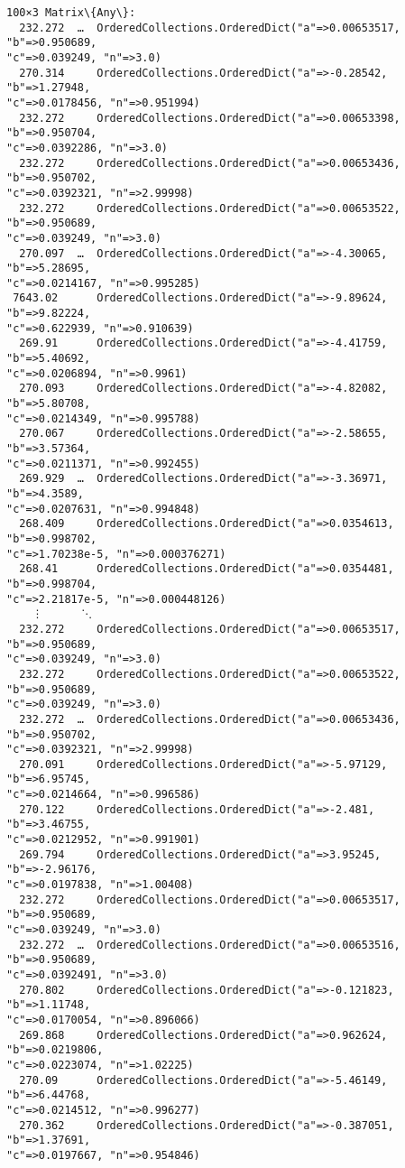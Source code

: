 \documentclass[11pt]{article}
\makeatletter
\newcommand{\boxspacing}{\kern\kvtcb@left@rule\kern\kvtcb@boxsep}
\newcommand{\prompt}[4]{
        {\ttfamily\llap{{\color{#2}[#3]:\hspace{3pt}#4}}\vspace{-\baselineskip}}
    }
\makeatother
\begin{document}
            \begin{tcolorbox}[breakable, size=fbox, boxrule=.5pt, pad at break*=1mm, opacityfill=0]
\prompt{Out}{outcolor}{17}{\boxspacing}
\begin{Verbatim}[commandchars=\\\{\}]
100×3 Matrix\{Any\}:
  232.272  …  OrderedCollections.OrderedDict("a"=>0.00653517, "b"=>0.950689,
"c"=>0.039249, "n"=>3.0)
  270.314     OrderedCollections.OrderedDict("a"=>-0.28542, "b"=>1.27948,
"c"=>0.0178456, "n"=>0.951994)
  232.272     OrderedCollections.OrderedDict("a"=>0.00653398, "b"=>0.950704,
"c"=>0.0392286, "n"=>3.0)
  232.272     OrderedCollections.OrderedDict("a"=>0.00653436, "b"=>0.950702,
"c"=>0.0392321, "n"=>2.99998)
  232.272     OrderedCollections.OrderedDict("a"=>0.00653522, "b"=>0.950689,
"c"=>0.039249, "n"=>3.0)
  270.097  …  OrderedCollections.OrderedDict("a"=>-4.30065, "b"=>5.28695,
"c"=>0.0214167, "n"=>0.995285)
 7643.02      OrderedCollections.OrderedDict("a"=>-9.89624, "b"=>9.82224,
"c"=>0.622939, "n"=>0.910639)
  269.91      OrderedCollections.OrderedDict("a"=>-4.41759, "b"=>5.40692,
"c"=>0.0206894, "n"=>0.9961)
  270.093     OrderedCollections.OrderedDict("a"=>-4.82082, "b"=>5.80708,
"c"=>0.0214349, "n"=>0.995788)
  270.067     OrderedCollections.OrderedDict("a"=>-2.58655, "b"=>3.57364,
"c"=>0.0211371, "n"=>0.992455)
  269.929  …  OrderedCollections.OrderedDict("a"=>-3.36971, "b"=>4.3589,
"c"=>0.0207631, "n"=>0.994848)
  268.409     OrderedCollections.OrderedDict("a"=>0.0354613, "b"=>0.998702,
"c"=>1.70238e-5, "n"=>0.000376271)
  268.41      OrderedCollections.OrderedDict("a"=>0.0354481, "b"=>0.998704,
"c"=>2.21817e-5, "n"=>0.000448126)
    ⋮      ⋱
  232.272     OrderedCollections.OrderedDict("a"=>0.00653517, "b"=>0.950689,
"c"=>0.039249, "n"=>3.0)
  232.272     OrderedCollections.OrderedDict("a"=>0.00653522, "b"=>0.950689,
"c"=>0.039249, "n"=>3.0)
  232.272  …  OrderedCollections.OrderedDict("a"=>0.00653436, "b"=>0.950702,
"c"=>0.0392321, "n"=>2.99998)
  270.091     OrderedCollections.OrderedDict("a"=>-5.97129, "b"=>6.95745,
"c"=>0.0214664, "n"=>0.996586)
  270.122     OrderedCollections.OrderedDict("a"=>-2.481, "b"=>3.46755,
"c"=>0.0212952, "n"=>0.991901)
  269.794     OrderedCollections.OrderedDict("a"=>3.95245, "b"=>-2.96176,
"c"=>0.0197838, "n"=>1.00408)
  232.272     OrderedCollections.OrderedDict("a"=>0.00653517, "b"=>0.950689,
"c"=>0.039249, "n"=>3.0)
  232.272  …  OrderedCollections.OrderedDict("a"=>0.00653516, "b"=>0.950689,
"c"=>0.0392491, "n"=>3.0)
  270.802     OrderedCollections.OrderedDict("a"=>-0.121823, "b"=>1.11748,
"c"=>0.0170054, "n"=>0.896066)
  269.868     OrderedCollections.OrderedDict("a"=>0.962624, "b"=>0.0219806,
"c"=>0.0223074, "n"=>1.02225)
  270.09      OrderedCollections.OrderedDict("a"=>-5.46149, "b"=>6.44768,
"c"=>0.0214512, "n"=>0.996277)
  270.362     OrderedCollections.OrderedDict("a"=>-0.387051, "b"=>1.37691,
"c"=>0.0197667, "n"=>0.954846)
\end{Verbatim}
\end{tcolorbox}
        
\end{document}
